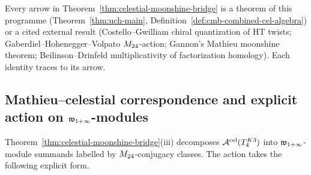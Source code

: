 \begin{remark}
\label{rem:cmb-construction-not-narration}
Every arrow in Theorem~\ref{thm:celestial-moonshine-bridge} is a theorem
of this programme
(Theorem~\ref{thm:uch-main}, Definition~\ref{def:cmb-combined-cel-algebra})
or a cited external result (Costello--Gwilliam chiral quantization of
HT twists; Gaberdiel--Hohenegger--Volpato $M_{24}$-action; Gannon's
Mathieu moonshine theorem; Beilinson--Drinfeld multiplicativity of
factorization homology). Each identity traces to its arrow.
\end{remark}

\subsection{Mathieu--celestial correspondence and explicit action on $\mathfrak w_{1+\infty}$-modules}
\label{subsec:cmb-twining}

Theorem~\ref{thm:celestial-moonshine-bridge}(iii) decomposes
$\mathcal A^{\mathrm{cel}}(T_4^{K3})$ into $\mathfrak w_{1+\infty}$-module summands
labelled by $M_{24}$-conjugacy classes. The action takes the
following explicit form.

